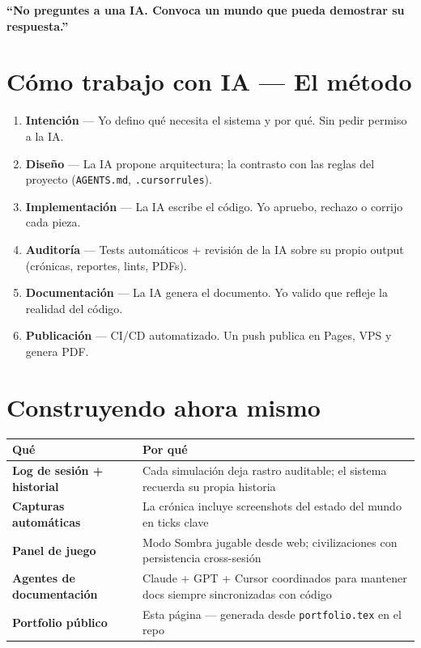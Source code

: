\documentclass[10pt,a4paper]{article}
\begin{document}
\vspace{0.4em}
\noindent\colorbox{dark!6}{\parbox{\dimexpr\linewidth-2\fboxsep\relax}{%
  \centering\medskip
  {\large\color{accent}\textbf{``No preguntes a una IA. Convoca un mundo que pueda demostrar su respuesta.''}}
  \medskip
}}

\section{C\'omo trabajo con IA --- El m\'etodo}

\begin{enumerate}[leftmargin=1.5em, itemsep=4pt]
  \item \textbf{Intenci\'on} ---
    Yo defino qu\'e necesita el sistema y por qu\'e.
    Sin pedir permiso a la IA.
  \item \textbf{Dise\~no} ---
    La IA propone arquitectura; la contrasto con las reglas del proyecto
    (\texttt{AGENTS.md}, \texttt{.cursorrules}).
  \item \textbf{Implementaci\'on} ---
    La IA escribe el c\'odigo. Yo apruebo, rechazo o corrijo cada pieza.
  \item \textbf{Auditor\'ia} ---
    Tests autom\'aticos + revisi\'on de la IA sobre su propio output
    (cr\'onicas, reportes, lints, PDFs).
  \item \textbf{Documentaci\'on} ---
    La IA genera el documento. Yo valido que refleje la realidad del c\'odigo.
  \item \textbf{Publicaci\'on} ---
    CI/CD automatizado. Un push publica en Pages, VPS y genera PDF.
\end{enumerate}

\section{Construyendo ahora mismo}

\begin{tabularx}{\linewidth}{>{\bfseries}p{4.2cm} X}
  \toprule
  Qu\'e & Por qu\'e \\
  \midrule
  Log de sesi\'on + historial &
    Cada simulaci\'on deja rastro auditable;
    el sistema recuerda su propia historia \\[3pt]
  Capturas autom\'aticas &
    La cr\'onica incluye screenshots del estado
    del mundo en ticks clave \\[3pt]
  Panel de juego &
    Modo Sombra jugable desde web;
    civilizaciones con persistencia cross-sesi\'on \\[3pt]
  Agentes de documentaci\'on &
    Claude + GPT + Cursor coordinados para
    mantener docs siempre sincronizadas con c\'odigo \\[3pt]
  Portfolio p\'ublico &
    Esta p\'agina --- generada desde
    \texttt{portfolio.tex} en el repo \\
  \bottomrule
\end{tabularx}
\end{document}

